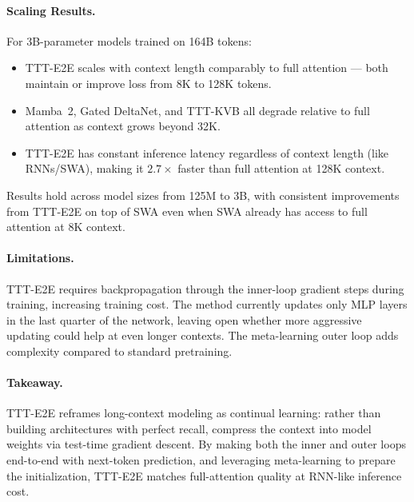 \documentclass[12pt]{article}
\begin{document}
\paragraph{Scaling Results.}
For 3B-parameter models trained on 164B tokens:

\begin{itemize}
		\item TTT-E2E scales with context length comparably to full attention ---
				both maintain or improve loss from 8K to 128K tokens.
		\item Mamba~2, Gated DeltaNet, and TTT-KVB all degrade relative to full
				attention as context grows beyond 32K.
		\item TTT-E2E has constant inference latency regardless of context length
				(like RNNs/SWA), making it $2.7\times$ faster than full attention
				at 128K context.
\end{itemize}

Results hold across model sizes from 125M to 3B, with consistent improvements
from TTT-E2E on top of SWA even when SWA already has access to full attention
at 8K context.

\paragraph{Limitations.}
TTT-E2E requires backpropagation through the inner-loop gradient steps during
training, increasing training cost. The method currently updates only MLP layers
in the last quarter of the network, leaving open whether more aggressive
updating could help at even longer contexts. The meta-learning outer loop
adds complexity compared to standard pretraining.

\paragraph{Takeaway.}
TTT-E2E reframes long-context modeling as continual learning: rather than
building architectures with perfect recall, compress the context into model
weights via test-time gradient descent. By making both the inner and outer
loops end-to-end with next-token prediction, and leveraging meta-learning to
prepare the initialization, TTT-E2E matches full-attention quality at
RNN-like inference cost.
\end{document}
